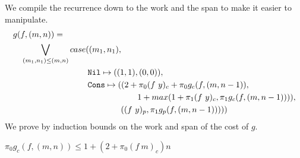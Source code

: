 We compile the recurrence down to the work and the span to make it easier to
manipulate.
%
\begin{equation*}
  \begin{split}
  &g(f, (m, n)) = \\
  &\quad \bigvee\limits_{(m_1, n_1) \leq (m, n)} case((m_1, n_1), \\
  &\qquad\quad\quad\quad\qquad\quad\quad \texttt{Nil} \mapsto ((1, 1), (0, 0)), \\
  &\qquad\quad\quad\quad\qquad\quad\quad \texttt{Cons} \mapsto ((2 + \pi_0(f\ y)_c + \pi_0 g_c(f, (m, n-1)), \\
  &\qquad\quad\quad\quad\qquad\quad\quad\quad\qquad\quad\quad\quad                     1 + max(1 + \pi_1(f\ y)_c, \pi_1 g_c(f, (m, n-1)))), \\
  &\qquad\quad\quad\quad\qquad\quad\quad\quad\quad\quad\quad                  ((f\ y)_p, \pi_1 g_p(f, (m, n-1)))))
  \end{split}
\end{equation*}
%
We prove by induction bounds on the work and span of the cost of $g$.
%
\begin{lemma}
$\pi_0 g_c(f, (m, n)) \leq 1 + (2 + \pi_0(f\ m)_c)n$
\end{lemma}
%
